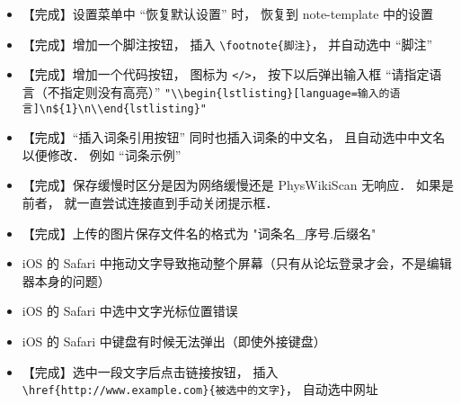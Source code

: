 \begin{itemize}
\item 【完成】设置菜单中 “恢复默认设置” 时， 恢复到 note-template 中的设置

\item 【完成】增加一个脚注按钮， 插入 \lstinline|\footnote{脚注}|， 并自动选中 “脚注”

\item 【完成】增加一个代码按钮， 图标为 \lstinline|</>|， 按下以后弹出输入框 “请指定语言（不指定则没有高亮）” \lstinline|"\\begin{lstlisting}[language=输入的语言]\n${1}\n\\end{lstlisting}"|

\item 【完成】“插入词条引用按钮” 同时也插入词条的中文名， 且自动选中中文名以便修改． 例如 “词条示例”

\item 【完成】保存缓慢时区分是因为网络缓慢还是 PhysWikiScan 无响应． 如果是前者， 就一直尝试连接直到手动关闭提示框．

\item 【完成】上传的图片保存文件名的格式为 "词条名_序号.后缀名"

\item iOS 的 Safari 中拖动文字导致拖动整个屏幕（只有从论坛登录才会，不是编辑器本身的问题）

\item iOS 的 Safari 中选中文字光标位置错误

\item iOS 的 Safari 中键盘有时候无法弹出（即使外接键盘）

\item 【完成】选中一段文字后点击链接按钮， 插入 \lstinline|\href{http://www.example.com}{被选中的文字}|， 自动选中网址
\end{itemize}


